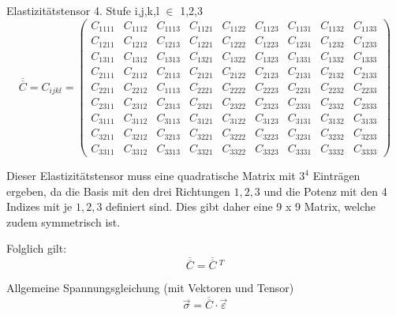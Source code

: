 Elastizitätstensor 4. Stufe i,j,k,l $\in$ {1,2,3}
\[
\overline{\overline{C}}
=
C_{ijkl}
=
\begin{pmatrix}
C_{1111} & C_{1112} & C_{1113} & C_{1121} & C_{1122} & C_{1123} & C_{1131} & C_{1132} & C_{1133} \\
C_{1211} & C_{1212} & C_{1213} & C_{1221} & C_{1222} & C_{1223} & C_{1231} & C_{1232} & C_{1233} \\
C_{1311} & C_{1312} & C_{1313} & C_{1321} & C_{1322} & C_{1323} & C_{1331} & C_{1332} & C_{1333} \\
C_{2111} & C_{2112} & C_{2113} & C_{2121} & C_{2122} & C_{2123} & C_{2131} & C_{2132} & C_{2133} \\
C_{2211} & C_{2212} & C_{1113} & C_{2221} & C_{2222} & C_{2223} & C_{2231} & C_{2232} & C_{2233} \\
C_{2311} & C_{2312} & C_{2313} & C_{2321} & C_{2322} & C_{2323} & C_{2331} & C_{2332} & C_{2333} \\
C_{3111} & C_{3112} & C_{3113} & C_{3121} & C_{3122} & C_{3123} & C_{3131} & C_{3132} & C_{3133} \\
C_{3211} & C_{3212} & C_{3213} & C_{3221} & C_{3222} & C_{3223} & C_{3231} & C_{3232} & C_{3233} \\
C_{3311} & C_{3312} & C_{3313} & C_{3321} & C_{3322} & C_{3323} & C_{3331} & C_{3332} & C_{3333}
\end{pmatrix}
\]

Dieser Elastizitätstensor muss eine quadratische Matrix mit $3^{4}$ Einträgen ergeben,
da die Basis mit den drei Richtungen $1, 2, 3$ und die Potenz mit den 4 Indizes mit je $1, 2, 3$ definiert sind.
Dies gibt daher eine 9 x 9 Matrix, welche zudem symmetrisch ist.

Folglich gilt:
\[
\overline{\overline{C}}
=
\overline{\overline{C}}~^{T}
\]

Allgemeine Spannungsgleichung (mit Vektoren und Tensor)
\[
\vec\sigma
=
\overline{\overline{C}}\cdot\vec{\varepsilon}
\]

